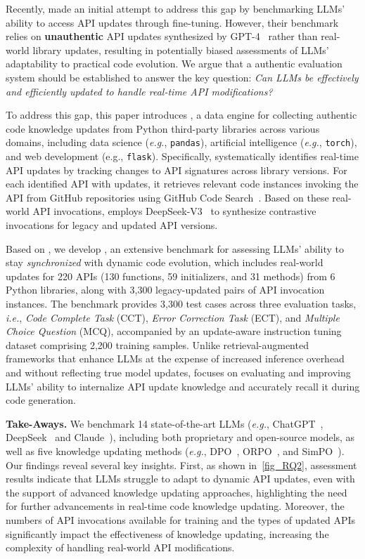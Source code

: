 Recently, \citet{liu2024codeupdatearena} made an initial attempt to address this gap by benchmarking LLMs' ability to access API updates through fine-tuning. 
However, their benchmark relies on \textbf{unauthentic} API updates synthesized by GPT-4~\cite{openai2024gpt4} rather than real-world library updates, resulting in potentially biased assessments of LLMs' adaptability to practical code evolution.
We argue that a authentic evaluation system should be established to answer the key question: \textit{Can LLMs be effectively and efficiently updated to handle real-time API modifications?}

To address this gap, this paper introduces \method, a data engine for collecting authentic code knowledge updates from Python third-party libraries across various domains, including data science (\emph{e.g.}, \texttt{pandas}),  artificial intelligence (\emph{e.g.}, \texttt{torch}), and web development (e.g., \texttt{flask}). 
Specifically, \method systematically identifies real-time API updates by tracking changes to API signatures across library versions. 
For each identified API with updates, it retrieves relevant code instances invoking the API from GitHub repositories using GitHub Code Search~\cite{github_code_search}.
Based on these real-world API invocations, \method employs DeepSeek-V3~\cite{liu2024deepseekv3} to synthesize contrastive invocations for legacy and updated API versions.

Based on \method, we develop \benchmark, an extensive benchmark for assessing LLMs’ ability to stay \textit{synchronized} with dynamic code evolution, which includes real-world updates for 220 APIs (130 functions, 59 initializers, and 31 methods) from 6 Python libraries, along with 3,300 legacy-updated pairs of API invocation instances.
The benchmark provides 3,300 test cases across three evaluation tasks, \emph{i.e.}, \textit{Code Complete Task} (CCT), \textit{Error Correction Task} (ECT), and \textit{Multiple Choice Question} (MCQ), accompanied by an update-aware instruction tuning dataset comprising 2,200 training samples.
Unlike retrieval-augmented frameworks that enhance LLMs at the expense of increased inference overhead and without reflecting true model updates, 
\benchmark focuses on evaluating and improving LLMs’ ability to internalize API update knowledge and accurately recall it during code generation.

\textbf{Take-Aways.}
We benchmark 14 state-of-the-art LLMs {(\emph{e.g.}, ChatGPT~\cite{openai2024gpt4}, DeepSeek~\cite{liu2024deepseekv3} and Claude~\cite{anthropic2024claude})}, including both proprietary and open-source models, as well as five knowledge updating methods {(\emph{e.g.}, DPO~\cite{rafailov2023dpo}, ORPO~\cite{hong2024orpo}, and SimPO~\cite{meng2024simpo})}.
Our findings reveal several key insights.
First, as shown in~\autoref{fig_RQ2}, assessment results indicate that LLMs struggle to adapt to dynamic API updates, even with the support of advanced knowledge updating approaches, highlighting the need for further advancements in real-time code knowledge updating. 
Moreover, the numbers of API invocations available for training and the types of updated APIs significantly impact the effectiveness of knowledge updating, increasing the complexity of handling real-world API modifications.

